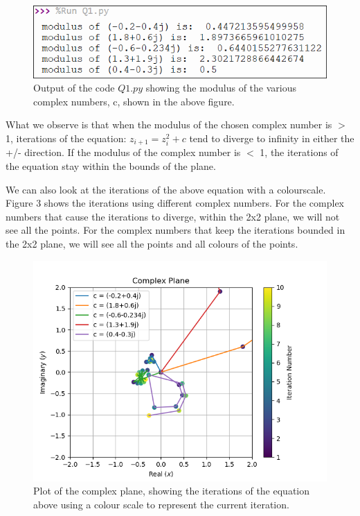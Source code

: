 \documentclass{article}
\begin{document}
\begin{figure}[!ht]
    \centering
    \includegraphics[scale=0.75]{Q1_pic.png}
    \caption{Output of the code $Q1.py$ showing the modulus of the various complex numbers, c, shown in the above figure.}
    \label{fig:Q1_pic.png}
\end{figure}

What we observe is that when the modulus of the chosen complex number is $>$ 1, iterations of the equation: $z_{i + 1} = z_i^2 + c$ tend to diverge to infinity in either the +/- direction. If the modulus of the complex number is $<$ 1, the iterations of the equation stay within the bounds of the plane.

We can also look at the iterations of the above equation with a colourscale. Figure 3 shows the iterations using different complex numbers.
For the complex numbers that cause the iterations to diverge, within the 2x2 plane, we will not see all the points.
For the complex numbers that keep the iterations bounded in the 2x2 plane, we will see all the points and all colours of the points.

\begin{figure}[!ht]
    \centering
    \includegraphics[scale=0.9]{Q1_plot2.png}
    \caption{Plot of the complex plane, showing the iterations of the equation above using a colour scale to represent the current iteration.}
    \label{fig:Q1_plot2.png}
\end{figure}
\end{document}
